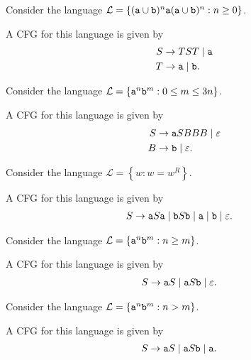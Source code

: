 \documentclass{notes}
\begin{document}
\begin{eg}
  Consider the language $\mathcal L = \left \{ (\verb~a~ \cup \verb~b~)^n \verb~a~ (\verb~a~ \cup \verb~b~)^n : n \geq 0 \right \}$.
  
  A CFG for this language is given by
  \begin{align*}
    S &\to T S T \; | \; \verb~a~ \\ 
    T &\to \verb~a~ \; | \; \verb~b~.
  \end{align*}
\end{eg}

\begin{eg}
  Consider the language $\mathcal L = \left \{ \verb~a~^n \verb~b~^m : 0 \leq m \leq 3 n \right \}$.

  A CFG for this language is given by
  \begin{align*}
    S &\to \verb~a~ S B B B \; | \; \varepsilon \\ 
    B &\to \verb~b~ \; | \; \varepsilon.
  \end{align*}
\end{eg}

\begin{eg}
  Consider the language $\mathcal L = \left \{ w : w = w^R \right \}$.
  
  A CFG for this language is given by
  \begin{align*}
    S &\to \verb~a~ S \verb~a~ \; | \; \verb~b~ S \verb~b~ \; | \; \verb~a~ \; | \; \verb~b~ \; | \; \varepsilon.
  \end{align*}
\end{eg}

\begin{eg}
  Consider the language $\mathcal L = \left \{ \verb~a~^n \verb~b~^m : n \geq m \right \}$.
  
  A CFG for this language is given by 
  \begin{align*}
    S &\to \verb~a~ S \; | \; \verb~a~ S \verb~b~ \; | \; \varepsilon.
  \end{align*}
\end{eg}

\begin{eg}
  Consider the language $\mathcal L = \left \{ \verb~a~^n \verb~b~^m : n > m \right \}$.
  
  A CFG for this language is given by 
  \begin{align*}
    S &\to \verb~a~ S \; | \; \verb~a~ S \verb~b~ \; | \; \verb~a~.
  \end{align*}
\end{eg}
\end{document}
